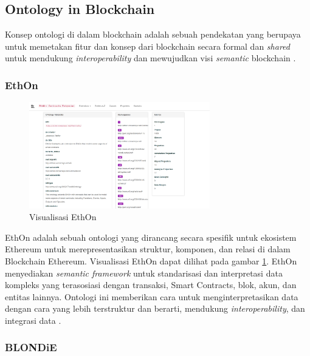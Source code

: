 \subsection{Ontology in Blockchain}
\label{subsec:ontology-in-blockchain}

Konsep ontologi di dalam blockchain adalah sebuah pendekatan yang berupaya untuk memetakan fitur dan konsep dari blockchain secara formal dan \textit{shared} untuk mendukung \textit{interoperability} \parencite{9770809} dan mewujudkan visi \textit{semantic} blockchain \parencite{hector2020blondie}.

\subsubsection{EthOn}
\label{subsubsec:ethon}

\begin{figure}[ht]
	\centering
	\includegraphics[width=0.7\textwidth]{resources/chapter-2/ethon.png}
	\caption{Visualisasi EthOn \parencite{ethon2024}}
	\label{image:ethon}
\end{figure}

EthOn adalah sebuah ontologi yang dirancang secara spesifik untuk ekosistem Ethereum untuk merepresentasikan struktur, komponen, dan relasi di dalam Blockchain Ethereum. Visualisasi EthOn dapat dilihat pada gambar \ref{image:ethon}. EthOn menyediakan \textit{semantic framework} untuk standarisasi dan interpretasi data kompleks yang terasosiasi dengan transaksi, Smart Contracts, blok, akun, dan entitas lainnya. Ontologi ini memberikan cara untuk menginterpretasikan data dengan cara yang lebih terstruktur dan berarti, mendukung \textit{interoperability}, dan integrasi data \parencite{pfeffer2016ethon}.

\subsubsection{BLONDiE}
\label{subsubsec:blondie}

